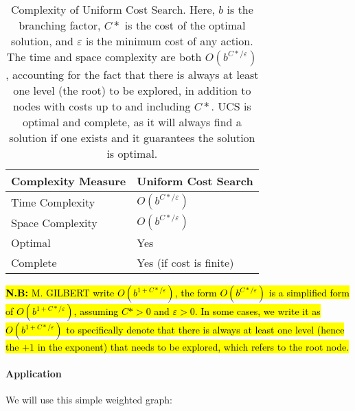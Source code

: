 \documentclass[a4paper,UKenglish,cleveref, autoref, thm-restate]{qlinhta}
\begin{document}
\begin{table}[H]
\centering
\begin{tabular}{|l|l|}
\hline
\textbf{Complexity Measure} & \textbf{Uniform Cost Search} \\
\hline
Time Complexity & $O(b^{C*/\varepsilon})$ \\
\hline
Space Complexity & $O(b^{C*/\varepsilon})$ \\
\hline
Optimal & Yes \\
\hline
Complete & Yes (if cost is finite) \\
\hline
\end{tabular}
\caption{Complexity of Uniform Cost Search. Here, $b$ is the branching factor, $C*$ is the cost of the optimal solution, and $\varepsilon$ is the minimum cost of any action. The time and space complexity are both $O(b^{C*/\varepsilon})$, accounting for the fact that there is always at least one level (the root) to be explored, in addition to nodes with costs up to and including $C*$. UCS is optimal and complete, as it will always find a solution if one exists and it guarantees the solution is optimal.}
\label{tab:ucs_complexity_detailed}
\end{table}

\hl{\textbf{N.B:} M. GILBERT write $O(b^{1 + C*/\varepsilon})$, the form $O(b^{C*/\varepsilon})$ is a simplified form of $O(b^{1 + C*/\varepsilon})$, assuming $C* > 0$ and $\varepsilon > 0$. In some cases, we write it as $O(b^{1 + C*/\varepsilon})$ to specifically denote that there is always at least one level (hence the $+1$ in the exponent) that needs to be explored, which refers to the root node.}

\paragraph*{Application}
We will use this simple weighted graph:

\begin{center}
\end{center}
\end{document}
